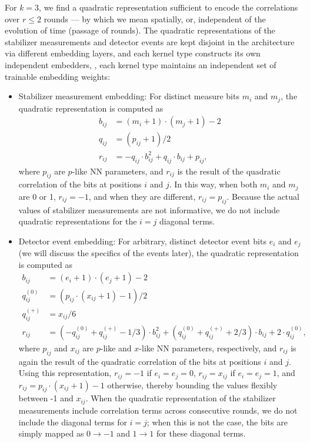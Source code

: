 For $k=3$, we find a quadratic representation sufficient to encode the correlations over $r \leq 2$ rounds --- by which we mean spatially, or, independent of the evolution of time (passage of rounds).
The quadratic representations of the stabilizer measurements and detector events are kept disjoint in the architecture via different embedding layers, and each kernel type constructs its own independent embedders, \ie, each kernel type maintains an independent set of trainable embedding weights:
\begin{itemize}
\item Stabilizer measurement embedding: For distinct measure bits $m_i$ and $m_j$, the quadratic representation is computed as
\begin{equation}
\begin{aligned}
b_{ij}&=(m_i+1) \cdot (m_j+1) - 2 \\
q_{ij}&=(p_{ij}+1)/2 \\
r_{ij}&=-q_{ij} \cdot b^2_{ij} + q_{ij} \cdot b_{ij}+ p_{ij},
\end{aligned}
\end{equation}
where $p_{ij}$ are $p$-like NN parameters, and $r_{ij}$ is the result of the quadratic correlation of the bits at positions $i$ and $j$. 
In this way, when both $m_i$ and $m_j$ are 0 or 1, $r_{ij}=-1$, and when they are different, $r_{ij}=p_{ij}$.
Because the actual values of stabilizer measurements are not informative, we do not include quadratic representations for the $i=j$ diagonal terms.
\item Detector event embedding: For arbitrary, distinct detector event bits $e_i$ and $e_j$ (we will discuss the specifics of the events later), the quadratic representation is computed as
\begin{equation}
\begin{aligned}
b_{ij}&=(e_i+1) \cdot (e_j+1) - 2 \\
q^{(0)}_{ij}&=\left(p_{ij}\cdot\left(x_{ij}+1 \right)-1\right)/2 \\
q^{(+)}_{ij}&=x_{ij}/6 \\
r_{ij}&=(-q^{(0)}_{ij}+q^{(+)}_{ij}-1/3) \cdot b^2_{ij} + (q^{(0)}_{ij}+q^{(+)}_{ij}+2/3) \cdot b_{ij}+ 2 \cdot q^{(0)}_{ij},
\end{aligned}
\end{equation}
where $p_{ij}$ and $x_{ij}$ are $p$-like and $x$-like NN parameters, respectively, and $r_{ij}$ is again the result of the quadratic correlation of the bits at positions $i$ and $j$.
Using this representation, $r_{ij}=-1$ if $e_i=e_j=0$, $r_{ij}=x_{ij}$ if $e_i=e_j=1$, and $r_{ij}=p_{ij}\cdot\left(x_{ij}+1 \right)-1$ otherwise, thereby bounding the values flexibly between -1 and $x_{ij}$.
When the quadratic representation of the stabilizer measurements include correlation terms across consecutive rounds, we do not include the diagonal terms for $i=j$; when this is not the case, the bits are simply mapped as $0\to -1$ and $1\to1$ for these diagonal terms.
\end{itemize}

